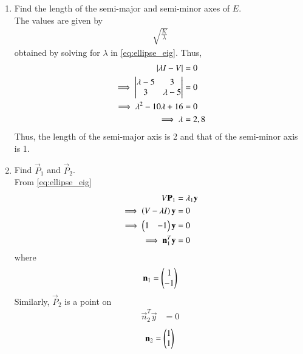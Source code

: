 \documentclass[journal,12pt,twocolumn]{IEEEtran}
\renewcommand\thesection{\arabic{section}}
\begin{document}
\begin{enumerate}[label=\thesection.\arabic*
,ref=\thesection.\theenumi]
\item Find the length of the semi-major and semi-minor axes of $E$.
\\
\solution The values are given by
\begin{align}
\sqrt{\frac{K}{\lambda}}
\label{eq:ellipsekl}
\end{align}
obtained by solving for $\lambda$ in \eqref{eq:ellipse_eig}.  Thus,
\begin{align}
\left\vert\lambda I-V\right\vert &= 0
\label{eq:ellipse_ceq}
\\
\implies\begin{vmatrix}\lambda -5 & 3 \\ 3 & \lambda -5\end{vmatrix} & = 0
\\
\implies \lambda^2 -10 \lambda+ 16 &= 0
\\
\implies \lambda &= 2, 8
\end{align}
Thus, the length of the semi-major axis is 2 and that of the semi-minor axis is 1.
\item Find $\vec{P}_1$ and $\vec{P}_2$.
\\
\solution From \eqref{eq:ellipse_eig}
\begin{align}
V\mathbf{P}_1 &= \lambda_1 \mathbf{y}
\\
\implies \left(V-\lambda I\right) \mathbf{y}&= 0
\\
\implies \begin{pmatrix}1 & -1\end{pmatrix} \mathbf{y}&= 0
\\
\implies \mathbf{n}_1^T \mathbf{y}&= 0
\label{eq:ellipsen1}
\end{align}
%
where
\begin{align}
\mathbf{n}_1= \begin{pmatrix}1 \\ -1\end{pmatrix}
\end{align}
%
Similarly, $\vec{P}_2$ is a point on
\begin{align}
\vec{n}_2^T \vec{y}&= 0
\end{align}
%
\begin{align}
\mathbf{n}_2= \begin{pmatrix}1 \\ 1\end{pmatrix}
\end{align}


\end{enumerate}
\end{document}
